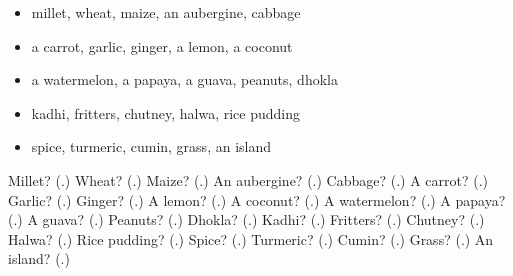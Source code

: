 \begin{itemize}
\raggedright
  \item millet, wheat, maize, an aubergine, cabbage
  \item a carrot, garlic, ginger, a lemon, a coconut
  \item a watermelon, a papaya, a guava, peanuts, dhokla
  \item kadhi, fritters, chutney, halwa, rice pudding
  \item spice, turmeric, cumin, grass, an island
\end{itemize}

\begin{tcolorbox}[breakable,colback=teal!4,colframe=teal!35!black,title={Before you move on}]
Millet? (\textbf{}.) Wheat? (\textbf{}.) Maize? (\textbf{}.) An aubergine? (\textbf{}.) Cabbage? (\textbf{}.) A carrot? (\textbf{}.) Garlic? (\textbf{}.) Ginger? (\textbf{}.) A lemon? (\textbf{}.) A coconut? (\textbf{}.) A watermelon? (\textbf{}.) A papaya? (\textbf{}.) A guava? (\textbf{}.) Peanuts? (\textbf{}.) Dhokla? (\textbf{}.) Kadhi? (\textbf{}.) Fritters? (\textbf{}.) Chutney? (\textbf{}.) Halwa? (\textbf{}.) Rice pudding? (\textbf{}.) Spice? (\textbf{}.) Turmeric? (\textbf{}.) Cumin? (\textbf{}.) Grass? (\textbf{}.) An island? (\textbf{}.)
\end{tcolorbox}
